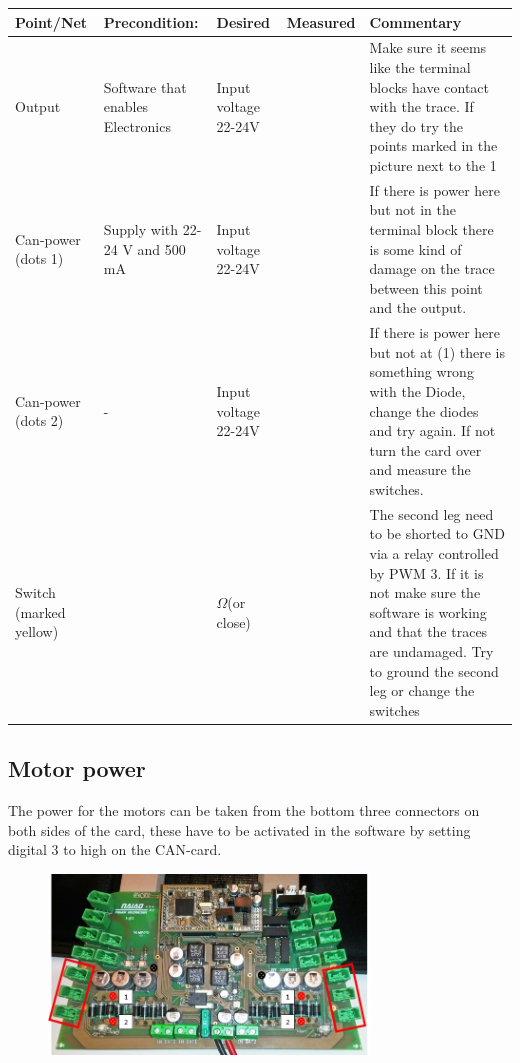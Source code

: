 \begin{table}[ht]
\begin{tabularx}{\textwidth}{|>{\hsize=0.6\hsize}X|>{\hsize=0.8\hsize}X|>{\hsize=0.8\hsize}X|c|>{\hsize=1.8\hsize}X|}
\hline 
 Point/Net & Precondition: & Desired & Measured & Commentary \\ 
\hline
Output & Software that enables Electronics & Input voltage
22-24V &   & Make sure it seems like the terminal blocks have contact with the trace. If they do try the points marked in the picture next to the 1  \\ 
\hline 
Can-power (dots 1) & Supply with 22-24 V and 500 mA & Input voltage 22-24V &    & If there is power here but not in the terminal block there is some kind of damage on the trace between this point and the output. \\ 
\hline 
Can-power (dots 2) & - & Input voltage 22-24V &   & If there is power here but not at (1) there is something wrong with the Diode, change the diodes and try again. If not turn the card over and measure the switches. \\ 
\hline 
Switch (marked yellow) &  & 0$\Omega$(or close)&    & The second leg need to be shorted to GND via a relay controlled by PWM 3. If it is not make sure the software is working and that the traces are undamaged. Try to ground the second leg or change the switches \\ 
\hline
\end{tabularx}
\end{table}

\newpage
\subsection{Motor power}
The power for the motors can be taken from the bottom three connectors on both sides of the card, these have to be activated in the software by setting digital 3 to high on the CAN-card.
\begin{figure}[!ht]
	\begin{center}
		\includegraphics[width=0.76\textwidth]{./Images/Unit_test_power_board/motor_pwr.jpg}
		\label{motor_pwr}
	\end{center}
\end{figure}

